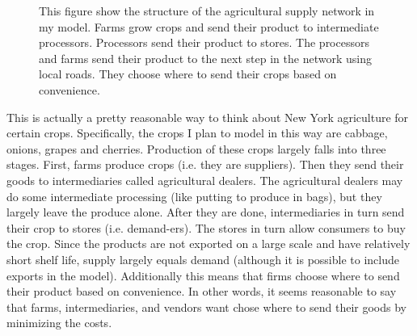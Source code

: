 \documentclass{report}
\begin{document}
\begin{figure}
\centering
\begin{framed}
\caption{This figure show the structure of the agricultural supply network in my model. Farms grow crops and send their product to intermediate processors. Processors send their product to stores. The processors and farms send their product to the next step in the network using local roads. They choose where to send their crops based on convenience.}
\label{fig:spec}
\end{framed}
\end{figure}

This is actually a pretty reasonable way to think about New York agriculture for certain crops. Specifically, the crops I plan to model in this way are cabbage, onions, grapes and cherries. Production of these crops largely falls into three stages. First, farms produce crops (i.e. they are suppliers). Then they send their goods to intermediaries called agricultural dealers. The agricultural dealers may do some intermediate processing (like putting to produce in bags), but they largely leave the produce alone. After they are done, intermediaries in turn send their crop to stores (i.e. demand-ers). The stores in turn allow consumers to buy the crop. Since the products are not exported on a large scale and have relatively short shelf life, supply largely equals demand (although it is possible to include exports in the model). Additionally this means that firms choose where to send their product based on convenience. In other words, it seems reasonable to say that farms, intermediaries, and vendors want chose where to send their goods by minimizing the costs. 
\end{document}

